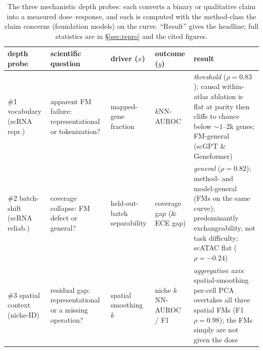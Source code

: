 \documentclass[11pt]{article}
\begin{document}
\begin{table}[!ht]\centering\footnotesize
\caption{The three mechanistic depth probes: each converts a binary or qualitative claim into a measured dose--response, and each is computed with the method-class the claim concerns (foundation models) on the curve. ``Result'' gives the headline; full statistics are in \S\ref{sec:repro} and the cited figures.}\label{tab:probes}
\begin{tabular}{@{}>{\raggedright\arraybackslash}p{1.9cm} >{\raggedright\arraybackslash}p{2.9cm} >{\raggedright\arraybackslash}p{2.0cm} >{\raggedright\arraybackslash}p{1.9cm} >{\raggedright\arraybackslash}p{4.5cm}@{}}
\toprule
depth probe & scientific question & driver ($x$) & outcome ($y$) & result \\
\midrule
\#1 vocabulary (scRNA repr.) & apparent FM failure: representational or tokenization? & mapped-gene fraction & $k$NN-AUROC & \emph{threshold} ($\rho{=}0.83$); causal within-atlas ablation is flat at parity then cliffs to chance below ${\sim}1$--$2$k genes; FM-general (scGPT \& Geneformer) \\[2pt]
\#2 batch-shift (scRNA reliab.) & coverage collapse: FM defect or general? & held-out-batch separability & coverage gap (\& ECE gap) & \emph{general} ($\rho{=}0.82$); method- and model-general (FMs on the same curve); predominantly exchangeability, not task difficulty; scATAC flat ($\rho{=}{-}0.24$) \\[2pt]
\#3 spatial context (niche-ID) & residual gap: representational or a missing operation? & spatial smoothing $k$ & niche $k$NN-AUROC / F1 & \emph{aggregation axis}: spatial-smoothing per-cell PCA overtakes all three spatial FMs (F1 $\rho{=}0.98$); the FMs simply are not given the dose \\
\bottomrule
\end{tabular}
\end{table}
\end{document}

